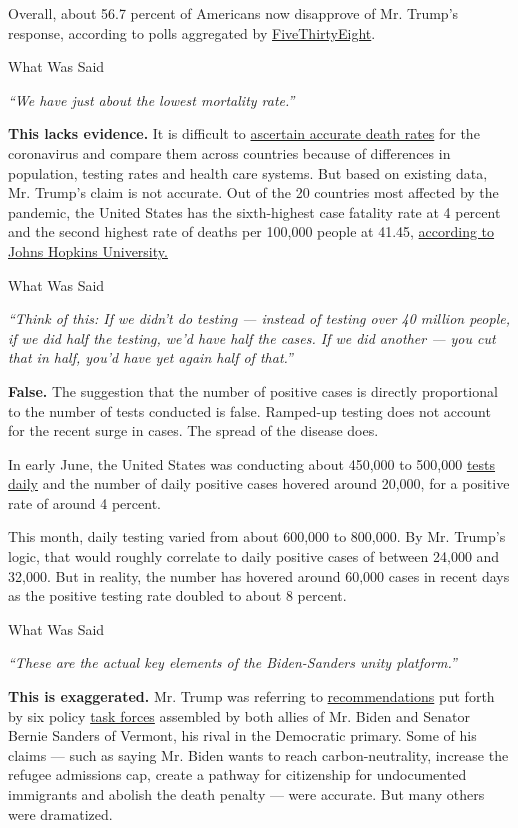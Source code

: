 Overall, about 56.7 percent of Americans now disapprove of Mr. Trump's
response, according to polls aggregated by
\href{https://projects.fivethirtyeight.com/coronavirus-polls/}{FiveThirtyEight}.

What Was Said

\emph{``We have just about the lowest mortality rate.''}

\textbf{This lacks evidence.} It is difficult to
\href{https://www.nytimes3xbfgragh.onion/2020/07/04/health/coronavirus-death-rate.html}{ascertain
accurate death rates} for the coronavirus and compare them across
countries because of differences in population, testing rates and health
care systems. But based on existing data, Mr. Trump's claim is not
accurate. Out of the 20 countries most affected by the pandemic, the
United States has the sixth-highest case fatality rate at 4 percent and
the second highest rate of deaths per 100,000 people at 41.45,
\href{https://coronavirus.jhu.edu/data/mortality}{according to Johns
Hopkins University.}

What Was Said

\emph{``Think of this: If we didn't do testing --- instead of testing
over 40 million people, if we did half the testing, we'd have half the
cases. If we did another --- you cut that in half, you'd have yet again
half of that.''}

\textbf{False.} The suggestion that the number of positive cases is
directly proportional to the number of tests conducted is false.
Ramped-up testing does not account for the recent surge in cases. The
spread of the disease does.

In early June, the United States was conducting about 450,000 to 500,000
\href{https://coronavirus.jhu.edu/testing/individual-states/usa}{tests
daily} and the number of daily positive cases hovered around 20,000, for
a positive rate of around 4 percent.

This month, daily testing varied from about 600,000 to 800,000. By Mr.
Trump's logic, that would roughly correlate to daily positive cases of
between 24,000 and 32,000. But in reality, the number has hovered around
60,000 cases in recent days as the positive testing rate doubled to
about 8 percent.

What Was Said

\emph{``These are the actual key elements of the Biden-Sanders unity
platform.''}

\textbf{This is exaggerated.} Mr. Trump was referring to
\href{https://joebiden.com/wp-content/uploads/2020/07/UNITY-TASK-FORCE-RECOMMENDATIONS.pdf}{recommendations}
put forth by six policy
\href{https://www.nytimes3xbfgragh.onion/2020/07/08/us/politics/biden-bernie-sanders.html}{task
forces} assembled by both allies of Mr. Biden and Senator Bernie Sanders
of Vermont, his rival in the Democratic primary. Some of his claims ---
such as saying Mr. Biden wants to reach carbon-neutrality, increase the
refugee admissions cap, create a pathway for citizenship for
undocumented immigrants and abolish the death penalty --- were accurate.
But many others were dramatized.

